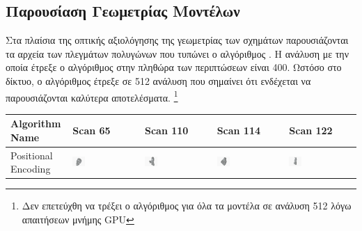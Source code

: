\subsection{Παρουσίαση Γεωμετρίας Μοντέλων}
Στα πλαίσια της οπτικής αξιολόγησης της γεωμετρίας των σχημάτων παρουσιάζονται τα αρχεία των πλεγμάτων πολυγώνων που τυπώνει ο αλγόριθμος . Η ανάλυση με την οποία έτρεξε ο αλγόριθμος στην πληθώρα των περιπτώσεων είναι 400. Ωστόσο στο  δίκτυο, ο αλγόριθμος έτρεξε σε 512 ανάλυση που σημαίνει ότι ενδέχεται να παρουσιάζονται καλύτερα αποτελέσματα. \footnote{Δεν επετεύχθη να τρέξει ο αλγόριθμος για όλα τα μοντέλα σε ανάλυση 512 λόγω απαιτήσεων μνήμης GPU}
\begin{table}[H]
\begin{tabularx}{\textwidth}{|p{3.2cm}|X|X|X|X|}
\hline
Algorithm Name & Scan 65 & Scan 110 & Scan 114 & Scan 122 \\
\hline
Positional Encoding & \includegraphics[width=0.2\textwidth]{images/chapter5_img/MeshReconResults/PositionalEncoding/65.jpg} & \includegraphics[width=0.2\textwidth]{images/chapter5_img/MeshReconResults/PositionalEncoding/110.jpg} & \includegraphics[width=0.2\textwidth]{images/chapter5_img/MeshReconResults/PositionalEncoding/114.jpg} & \includegraphics[width=0.2\textwidth]{images/chapter5_img/MeshReconResults/PositionalEncoding/122.jpg} \\
\hline

\end{tabularx}
\end{table}
